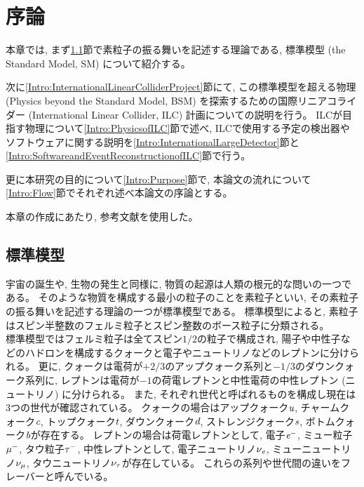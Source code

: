 
\chapter{序論} \label{chap:Introduction}

本章では, まず\ref{Intro:StandardModel}節で素粒子の振る舞いを記述する理論である, 標準模型 (the Standard Model, SM) について紹介する。

次に\ref{Intro:InternationalLinearColliderProject}節にて, この標準模型を超える物理 (Physics beyond the Standard Model, BSM) を探索するための国際リニアコライダー (International Linear Collider, ILC) 計画についての説明を行う。
ILCが目指す物理について\ref{Intro:PhysicsofILC}節で述べ, ILCで使用する予定の検出器やソフトウェアに関する説明を\ref{Intro:InternationalLargeDetector}節と\ref{Intro:SoftwareandEventReconstructionofILC}節で行う。

更に本研究の目的について\ref{Intro:Purpose}節で, 本論文の流れについて\ref{Intro:Flow}節でそれぞれ述べ本論文の序論とする。

本章の作成にあたり, 参考文献\cite{GlobalProject, InterimDesignReport}を使用した。


\section{標準模型} \label{Intro:StandardModel}

宇宙の誕生や, 生物の発生と同様に, 物質の起源は人類の根元的な問いの一つである。
そのような物質を構成する最小の粒子のことを素粒子といい, その素粒子の振る舞いを記述する理論の一つが標準模型である。
標準模型によると, 素粒子はスピン半整数のフェルミ粒子とスピン整数のボース粒子に分類される。\\

標準模型ではフェルミ粒子は全てスピン$1/2$の粒子で構成され, 陽子や中性子などのハドロンを構成するクォークと電子やニュートリノなどのレプトンに分けられる。
更に, クォークは電荷が$+2/3$のアップクォーク系列と$-1/3$のダウンクォーク系列に, レプトンは電荷が$-1$の荷電レプトンと中性電荷の中性レプトン (ニュートリノ) に分けられる。
また, それぞれ世代と呼ばれるものを構成し現在は3つの世代が確認されている。
クォークの場合はアップクォーク$\textit u$, チャームクォーク$\textit c$, トップクォーク$\textit t$, ダウンクォーク$\textit d$, ストレンジクォーク$\textit s$, ボトムクォーク$\textit b$が存在する。
レプトンの場合は荷電レプトンとして, 電子$\textit e^-$, ミュー粒子$\it \mu^-$, タウ粒子$\it \tau^-$, 中性レプトンとして, 電子ニュートリノ$\it \nu_e$, ミューニュートリノ$\it \nu_{\mu}$, タウニュートリノ$\it \nu_{\tau}$が存在している。
これらの系列や世代間の違いをフレーバーと呼んでいる。

